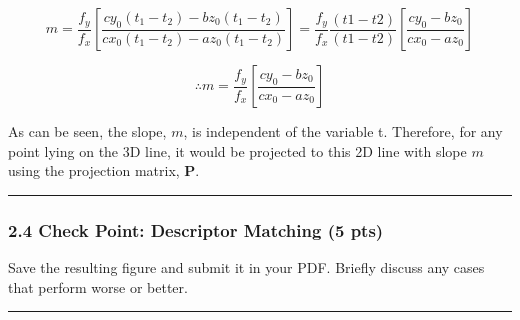 \documentclass[11pt]{article}
\begin{document}
\[m = \frac{f_y}{f_x}\left[\frac{c y_0 (t_1 - t_2) - b z_0 (t_1 - t_2)}{c x_0 (t_1 - t_2) - a z_0 (t_1 - t_2)}\right] = \frac{f_y}{f_x} \frac{(t1 - t2)}{(t1 - t2)} \left[\frac{c y_0 - b z_0 }{c x_0 - a z_0 }\right]\]

\[\therefore m = \frac{f_y}{f_x} \left[\frac{c y_0 - b z_0 }{c x_0 - a z_0 }\right]\]

As can be seen, the slope, \(m\), is independent of the variable t.
Therefore, for any point lying on the 3D line, it would be projected to
this 2D line with slope \(m\) using the projection matrix,
\(\mathbf{P}\).

\begin{center}\rule{0.5\linewidth}{0.5pt}\end{center}

    \hypertarget{check-point-descriptor-matching-5-pts}{%
\subsubsection{2.4 Check Point: Descriptor Matching (5
pts)}\label{check-point-descriptor-matching-5-pts}}

Save the resulting figure and submit it in your PDF. Briefly discuss any
cases that perform worse or better.

    \begin{center}\rule{0.5\linewidth}{0.5pt}\end{center}
\end{document}
